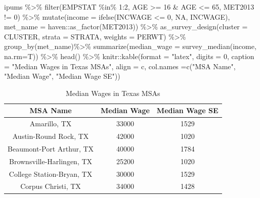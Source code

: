 \documentclass[
]{article}
\newenvironment{Shaded}{\begin{snugshade}}{\end{snugshade}}
\newcommand{\AttributeTok}[1]{\textcolor[rgb]{0.77,0.63,0.00}{#1}}
\newcommand{\ConstantTok}[1]{\textcolor[rgb]{0.00,0.00,0.00}{#1}}
\newcommand{\DecValTok}[1]{\textcolor[rgb]{0.00,0.00,0.81}{#1}}
\newcommand{\FunctionTok}[1]{\textcolor[rgb]{0.00,0.00,0.00}{#1}}
\newcommand{\NormalTok}[1]{#1}
\newcommand{\SpecialCharTok}[1]{\textcolor[rgb]{0.00,0.00,0.00}{#1}}
\newcommand{\StringTok}[1]{\textcolor[rgb]{0.31,0.60,0.02}{#1}}
\begin{document}
\begin{Shaded}
\begin{Highlighting}[]
\NormalTok{ipums }\SpecialCharTok{\%\textgreater{}\%}
  \FunctionTok{filter}\NormalTok{(EMPSTAT }\SpecialCharTok{\%in\%} \DecValTok{1}\SpecialCharTok{:}\DecValTok{2}\NormalTok{,}
\NormalTok{         AGE }\SpecialCharTok{\textgreater{}=} \DecValTok{16} \SpecialCharTok{\&}\NormalTok{ AGE }\SpecialCharTok{\textless{}=} \DecValTok{65}\NormalTok{, }
\NormalTok{         MET2013 }\SpecialCharTok{!=} \DecValTok{0}\NormalTok{) }\SpecialCharTok{\%\textgreater{}\%}
  \FunctionTok{mutate}\NormalTok{(}\AttributeTok{income =} \FunctionTok{ifelse}\NormalTok{(INCWAGE }\SpecialCharTok{\textless{}=} \DecValTok{0}\NormalTok{, }\ConstantTok{NA}\NormalTok{, INCWAGE),}
         \AttributeTok{met\_name =}\NormalTok{ haven}\SpecialCharTok{::}\FunctionTok{as\_factor}\NormalTok{(MET2013)) }\SpecialCharTok{\%\textgreater{}\%}
  \FunctionTok{as\_survey\_design}\NormalTok{(}\AttributeTok{cluster =}\NormalTok{ CLUSTER,}
                   \AttributeTok{strata =}\NormalTok{ STRATA,}
                   \AttributeTok{weights =}\NormalTok{ PERWT) }\SpecialCharTok{\%\textgreater{}\%}
  \FunctionTok{group\_by}\NormalTok{(met\_name)}\SpecialCharTok{\%\textgreater{}\%}
  \FunctionTok{summarize}\NormalTok{(}\AttributeTok{median\_wage =} \FunctionTok{survey\_median}\NormalTok{(income, }\AttributeTok{na.rm=}\NormalTok{T)) }\SpecialCharTok{\%\textgreater{}\%}  
  \FunctionTok{head}\NormalTok{() }\SpecialCharTok{\%\textgreater{}\%}
\NormalTok{  knitr}\SpecialCharTok{::}\FunctionTok{kable}\NormalTok{(}\AttributeTok{format =} \StringTok{"latex"}\NormalTok{,}
               \AttributeTok{digits =} \DecValTok{0}\NormalTok{,}
               \AttributeTok{caption =} \StringTok{"Median Wages in Texas MSAs"}\NormalTok{,}
               \AttributeTok{align =} \StringTok{\textquotesingle{}c\textquotesingle{}}\NormalTok{,}
               \AttributeTok{col.names =}\FunctionTok{c}\NormalTok{(}\StringTok{"MSA Name"}\NormalTok{, }\StringTok{"Median Wage"}\NormalTok{, }\StringTok{"Median Wage SE"}\NormalTok{))}
\end{Highlighting}
\end{Shaded}

\begin{table}

\caption{\label{tab:unnamed-chunk-104}Median Wages in Texas MSAs}
\centering
\begin{tabular}[t]{c|c|c}
\hline
MSA Name & Median Wage & Median Wage SE\\
\hline
Amarillo, TX & 33000 & 1529\\
\hline
Austin-Round Rock, TX & 42000 & 1020\\
\hline
Beaumont-Port Arthur, TX & 40000 & 1784\\
\hline
Brownsville-Harlingen, TX & 25200 & 1020\\
\hline
College Station-Bryan, TX & 30000 & 1529\\
\hline
Corpus Christi, TX & 34000 & 1428\\
\hline
\end{tabular}
\end{table}
\end{document}
